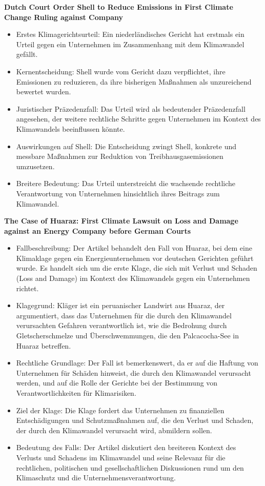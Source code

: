 \documentclass[a4paper, 12pt]{article} %
\begin{document}
 \textbf{\cite{domans2021dutch} Dutch Court Order Shell to Reduce Emissions in First Climate Change Ruling against Company}
 
 \begin{itemize}
    \item Erstes Klimagerichtsurteil: Ein niederländisches Gericht hat erstmals ein Urteil gegen ein Unternehmen im Zusammenhang mit dem Klimawandel gefällt.
    \item Kernentscheidung: Shell wurde vom Gericht dazu verpflichtet, ihre Emissionen zu reduzieren, da ihre bisherigen Maßnahmen als unzureichend bewertet wurden.
    \item Juristischer Präzedenzfall: Das Urteil wird als bedeutender Präzedenzfall angesehen, der weitere rechtliche Schritte gegen Unternehmen im Kontext des Klimawandels beeinflussen könnte.
    \item Auswirkungen auf Shell: Die Entscheidung zwingt Shell, konkrete und messbare Maßnahmen zur Reduktion von Treibhausgasemissionen umzusetzen.
    \item Breitere Bedeutung: Das Urteil unterstreicht die wachsende rechtliche Verantwortung von Unternehmen hinsichtlich ihres Beitrags zum Klimawandel.
 \end{itemize}

 \textbf{\cite{Frank2019} The Case of Huaraz: {{First}} Climate Lawsuit on Loss and Damage against an Energy Company before German Courts}

 \begin{itemize}
   \item Fallbeschreibung: Der Artikel behandelt den Fall von Huaraz, bei dem eine Klimaklage gegen ein Energieunternehmen vor deutschen Gerichten geführt wurde. Es handelt sich um die erste Klage, die sich mit Verlust und Schaden (Loss and Damage) im Kontext des Klimawandels gegen ein Unternehmen richtet.
   \item Klagegrund: Kläger ist ein peruanischer Landwirt aus Huaraz, der argumentiert, dass das Unternehmen für die durch den Klimawandel verursachten Gefahren verantwortlich ist, wie die Bedrohung durch Gletscherschmelze und Überschwemmungen, die den Palcacocha-See in Huaraz betreffen.
   \item Rechtliche Grundlage: Der Fall ist bemerkenswert, da er auf die Haftung von Unternehmen für Schäden hinweist, die durch den Klimawandel verursacht werden, und auf die Rolle der Gerichte bei der Bestimmung von Verantwortlichkeiten für Klimarisiken.
   \item Ziel der Klage: Die Klage fordert das Unternehmen zu finanziellen Entschädigungen und Schutzmaßnahmen auf, die den Verlust und Schaden, der durch den Klimawandel verursacht wird, abmildern sollen.
   \item Bedeutung des Falls: Der Artikel diskutiert den breiteren Kontext des Verlusts und Schadens im Klimawandel und seine Relevanz für die rechtlichen, politischen und gesellschaftlichen Diskussionen rund um den Klimaschutz und die Unternehmensverantwortung.
 \end{itemize}
\end{document}

